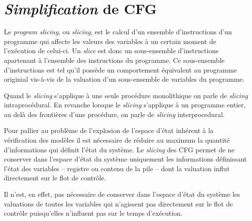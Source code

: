 \section{\textit{Simplification} de CFG}
\label{sec:simplification}


  Le \textit{program slicing}, ou \textit{slicing}, est le calcul d'un
  ensemble d'instructions d'un programme qui affecte les valeurs des
  variables à un certain moment de l'exécution de celui-ci. Un
  \textit{slice} est donc un sous-ensemble d'instructions apartenant à
  l'ensemble des instructions du programme. Ce sous-ensemble
  d'instructions est tel qu'il possède un comportement équivalent au
  programme originial vis-à-vis de la valuation d'un sous-ensemble de
  variables du programme.

  Quand le \textit{slicing} s'applique à une seule procédure monolithique on
  parle de \textit{slicing} intraprocédural. En revanche lorsque le
  \textit{slicing} s'applique à un programme entier, au delà des frontières
  d'une procédure, on parle de \textit{slicing} interprocedural.

  \vspace{1em}


  Pour pallier au problème de l'explosion de l'espace d'état inhérent à la
  vérification des modèles il est nécessaire de réduire au maximum la quantité
  d'informations qui définit l'état du système. Le \textit{slicing} des CFG permet
  de ne conserver dans l'espace d'état du système uniquement les informations
  définissant l'état des variables -- registre ou contenu de la pile -- dont la
  valuation influt directement sur le flot de contrôle.

  Il n'est, en effet, pas nécessaire de conserver dans l'espace d'état du
  système les valuations de toutes les variables qui n'agissent pas directement
  sur le flot de contrôle puisqu'elles n'influent pas sur le temps d'exécution.
  
  \vspace{1em}
  

